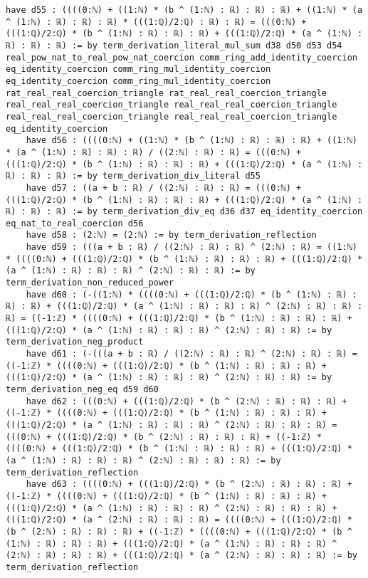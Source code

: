 \documentclass{article}
\begin{document}
\begin{tcolorbox}[colback=white!10, width=\linewidth]
\begin{lstlisting}[language=Lean4]
    have d55 : ((((0:ℕ) + ((1:ℕ) * (b ^ (1:ℕ) : ℝ) : ℝ) : ℝ) + ((1:ℕ) * (a ^ (1:ℕ) : ℝ) : ℝ) : ℝ) * (((1:ℚ)/2:ℚ) : ℝ) : ℝ) = (((0:ℕ) + (((1:ℚ)/2:ℚ) * (b ^ (1:ℕ) : ℝ) : ℝ) : ℝ) + (((1:ℚ)/2:ℚ) * (a ^ (1:ℕ) : ℝ) : ℝ) : ℝ) := by term_derivation_literal_mul_sum d38 d50 d53 d54 real_pow_nat_to_real_pow_nat_coercion comm_ring_add_identity_coercion eq_identity_coercion comm_ring_mul_identity_coercion eq_identity_coercion comm_ring_mul_identity_coercion rat_real_real_coercion_triangle rat_real_real_coercion_triangle real_real_real_coercion_triangle real_real_real_coercion_triangle real_real_real_coercion_triangle real_real_real_coercion_triangle eq_identity_coercion
    have d56 : ((((0:ℕ) + ((1:ℕ) * (b ^ (1:ℕ) : ℝ) : ℝ) : ℝ) + ((1:ℕ) * (a ^ (1:ℕ) : ℝ) : ℝ) : ℝ) / ((2:ℕ) : ℝ) : ℝ) = (((0:ℕ) + (((1:ℚ)/2:ℚ) * (b ^ (1:ℕ) : ℝ) : ℝ) : ℝ) + (((1:ℚ)/2:ℚ) * (a ^ (1:ℕ) : ℝ) : ℝ) : ℝ) := by term_derivation_div_literal d55
    have d57 : ((a + b : ℝ) / ((2:ℕ) : ℝ) : ℝ) = (((0:ℕ) + (((1:ℚ)/2:ℚ) * (b ^ (1:ℕ) : ℝ) : ℝ) : ℝ) + (((1:ℚ)/2:ℚ) * (a ^ (1:ℕ) : ℝ) : ℝ) : ℝ) := by term_derivation_div_eq d36 d37 eq_identity_coercion eq_nat_to_real_coercion d56
    have d58 : (2:ℕ) = (2:ℕ) := by term_derivation_reflection
    have d59 : (((a + b : ℝ) / ((2:ℕ) : ℝ) : ℝ) ^ (2:ℕ) : ℝ) = ((1:ℕ) * ((((0:ℕ) + (((1:ℚ)/2:ℚ) * (b ^ (1:ℕ) : ℝ) : ℝ) : ℝ) + (((1:ℚ)/2:ℚ) * (a ^ (1:ℕ) : ℝ) : ℝ) : ℝ) ^ (2:ℕ) : ℝ) : ℝ) := by term_derivation_non_reduced_power
    have d60 : (-((1:ℕ) * ((((0:ℕ) + (((1:ℚ)/2:ℚ) * (b ^ (1:ℕ) : ℝ) : ℝ) : ℝ) + (((1:ℚ)/2:ℚ) * (a ^ (1:ℕ) : ℝ) : ℝ) : ℝ) ^ (2:ℕ) : ℝ) : ℝ) : ℝ) = ((-1:ℤ) * ((((0:ℕ) + (((1:ℚ)/2:ℚ) * (b ^ (1:ℕ) : ℝ) : ℝ) : ℝ) + (((1:ℚ)/2:ℚ) * (a ^ (1:ℕ) : ℝ) : ℝ) : ℝ) ^ (2:ℕ) : ℝ) : ℝ) := by term_derivation_neg_product
    have d61 : (-(((a + b : ℝ) / ((2:ℕ) : ℝ) : ℝ) ^ (2:ℕ) : ℝ) : ℝ) = ((-1:ℤ) * ((((0:ℕ) + (((1:ℚ)/2:ℚ) * (b ^ (1:ℕ) : ℝ) : ℝ) : ℝ) + (((1:ℚ)/2:ℚ) * (a ^ (1:ℕ) : ℝ) : ℝ) : ℝ) ^ (2:ℕ) : ℝ) : ℝ) := by term_derivation_neg_eq d59 d60
    have d62 : (((0:ℕ) + (((1:ℚ)/2:ℚ) * (b ^ (2:ℕ) : ℝ) : ℝ) : ℝ) + ((-1:ℤ) * ((((0:ℕ) + (((1:ℚ)/2:ℚ) * (b ^ (1:ℕ) : ℝ) : ℝ) : ℝ) + (((1:ℚ)/2:ℚ) * (a ^ (1:ℕ) : ℝ) : ℝ) : ℝ) ^ (2:ℕ) : ℝ) : ℝ) : ℝ) = (((0:ℕ) + (((1:ℚ)/2:ℚ) * (b ^ (2:ℕ) : ℝ) : ℝ) : ℝ) + ((-1:ℤ) * ((((0:ℕ) + (((1:ℚ)/2:ℚ) * (b ^ (1:ℕ) : ℝ) : ℝ) : ℝ) + (((1:ℚ)/2:ℚ) * (a ^ (1:ℕ) : ℝ) : ℝ) : ℝ) ^ (2:ℕ) : ℝ) : ℝ) : ℝ) := by term_derivation_reflection
    have d63 : ((((0:ℕ) + (((1:ℚ)/2:ℚ) * (b ^ (2:ℕ) : ℝ) : ℝ) : ℝ) + ((-1:ℤ) * ((((0:ℕ) + (((1:ℚ)/2:ℚ) * (b ^ (1:ℕ) : ℝ) : ℝ) : ℝ) + (((1:ℚ)/2:ℚ) * (a ^ (1:ℕ) : ℝ) : ℝ) : ℝ) ^ (2:ℕ) : ℝ) : ℝ) : ℝ) + (((1:ℚ)/2:ℚ) * (a ^ (2:ℕ) : ℝ) : ℝ) : ℝ) = ((((0:ℕ) + (((1:ℚ)/2:ℚ) * (b ^ (2:ℕ) : ℝ) : ℝ) : ℝ) + ((-1:ℤ) * ((((0:ℕ) + (((1:ℚ)/2:ℚ) * (b ^ (1:ℕ) : ℝ) : ℝ) : ℝ) + (((1:ℚ)/2:ℚ) * (a ^ (1:ℕ) : ℝ) : ℝ) : ℝ) ^ (2:ℕ) : ℝ) : ℝ) : ℝ) + (((1:ℚ)/2:ℚ) * (a ^ (2:ℕ) : ℝ) : ℝ) : ℝ) := by term_derivation_reflection

\end{lstlisting}
\end{tcolorbox}
\end{document}
